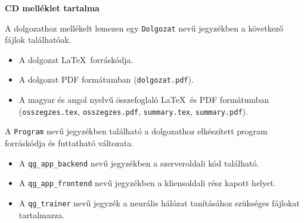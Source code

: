 \pagestyle{empty}

\noindent \textbf{\Large CD melléklet tartalma}

\vskip 1cm

\noindent A dolgozathoz mellékelt lemezen egy \texttt{Dolgozat} nevű jegyzékben a következő fájlok találhatóak.

\begin{itemize}
\item A dolgozat \LaTeX\ forráskódja.
\item A dolgozat PDF formátumban (\texttt{dolgozat.pdf}).
\item A magyar és angol nyelvű összefoglaló \LaTeX\ és PDF formátumban \\ (\texttt{osszegzes.tex}, \texttt{osszegzes.pdf}, \texttt{summary.tex}, \texttt{summary.pdf}).
\end{itemize}

A \texttt{Program} nevű jegyzékben található a dolgozathoz elkészített program forráskódja és futtatható változata.

\begin{itemize}
\item A \texttt{qg\_app\_backend} nevű jegyzékben a szerveroldali kód található.
\item A \texttt{qg\_app\_frontend} nevű jegyzékben a kliensoldali rész kapott helyet.
\item A \texttt{qg\_trainer} nevű jegyzék a neurális hálózat tanításához szükséges fájlokat tartalmazza.
\end{itemize}
